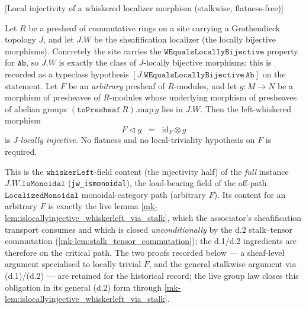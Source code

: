 \begin{lemma}

[Local injectivity of a whiskered localizer morphism (stalkwise, flatness-free)]
  \label{mk-lem:islocallyinjective_whisker_of_W}
  \leanok

  Let \(R\) be a presheaf of commutative rings on a site carrying a Grothendieck
  topology \(J\), and let \(J.W\) be the sheafification localizer (the locally
  bijective morphisms). Concretely the site carries the
  \(\mathtt{WEqualsLocallyBijective}\) property for \(\mathtt{Ab}\), so \(J.W\) is
  exactly the class of \(J\)-locally bijective morphisms; this is recorded as a
  typeclass hypothesis \([J.\mathtt{WEqualsLocallyBijective}\,\mathtt{Ab}]\) on
  the statement. Let \(F\) be an \emph{arbitrary} presheaf of
  \(R\)-modules, and let \(g : M \to N\) be a morphism of presheaves of
  \(R\)-modules whose underlying morphism of presheaves of abelian groups
  \((\mathtt{toPresheaf}\,R).\mathrm{map}\,g\) lies in \(J.W\). Then the
  left-whiskered morphism
  \[
    F \triangleleft g \;\;=\;\; \mathrm{id}_F \otimes g
  \]
  is \emph{\(J\)-locally injective}. No flatness and no local-triviality
  hypothesis on \(F\) is required.

  This is the \(\mathtt{whiskerLeft}\)-field content (the injectivity half) of the
  \emph{full} instance \(J.W.\mathtt{IsMonoidal}\) (\texttt{jw\_ismonoidal}), the
  load-bearing field of the off-path \(\mathtt{LocalizedMonoidal}\) monoidal-category
  path (arbitrary \(F\)). Its content for an arbitrary \(F\) is exactly the live lemma
  \ref{mk-lem:islocallyinjective_whiskerleft_via_stalk}, which the associator's
  sheafification transport consumes and which is closed \emph{unconditionally} by the
  d.2 stalk--tensor commutation (\ref{mk-lem:stalk_tensor_commutation}); the d.1/d.2
  ingredients are therefore on the critical path. The two proofs recorded below --- a
  sheaf-level argument specialised to locally trivial \(F\), and the general stalkwise
  argument via (d.1)/(d.2) --- are retained for the historical record; the live group
  law closes this obligation in its general (d.2) form through
  \ref{mk-lem:islocallyinjective_whiskerleft_via_stalk}.
\end{lemma}

